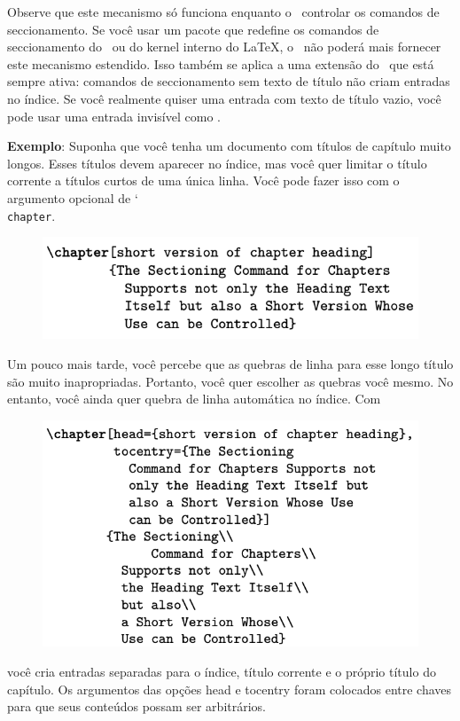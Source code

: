 Observe que este mecanismo só funciona enquanto o \KOMAScript\ controlar os comandos de seccionamento. Se você usar um pacote que redefine os comandos de seccionamento do \KOMAScript\ ou do kernel interno do \LaTeX, o \KOMAScript\ não poderá mais fornecer este mecanismo estendido. Isso também se aplica a uma extensão do \KOMAScript\ que está sempre ativa: comandos de seccionamento sem texto de título não criam entradas no índice. Se você realmente quiser uma entrada com texto de título vazio, você pode usar uma entrada invisível como \mbox{}.

\textbf{Exemplo}: Suponha que você tenha um documento com títulos de capítulo muito longos. Esses títulos devem aparecer no índice, mas você quer limitar o título corrente a títulos curtos de uma única linha. Você pode fazer isso com o argumento opcional de \char`\\\texttt{chap\-ter}.

\begin{figure}[h]
    \centering
    \includegraphics[width=0.60\linewidth]{imagem14.png}
    \label{fig:img14}
\end{figure}

Um pouco mais tarde, você percebe que as quebras de linha para esse longo título são muito inapropriadas. Portanto, você quer escolher as quebras você mesmo. No entanto, você ainda quer quebra de linha automática no índice. Com
\begin{figure}[h]
    \centering
    \includegraphics[width=0.60\linewidth]{imagem19.png}
    \label{fig:img19}
\end{figure}

você cria entradas separadas para o índice, título corrente e o próprio título do capítulo. Os argumentos das opções head e tocentry foram colocados entre chaves para que seus conteúdos possam ser arbitrários.

